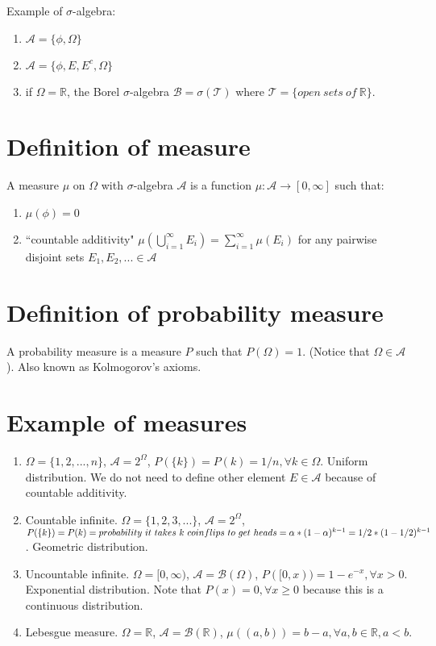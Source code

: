 \documentclass[12pt]{article}
\newcommand{\A}{\mathcal{A}}
\newcommand{\B}{\mathcal{B}}
\newcommand{\T}{\mathcal{T}}
\begin{document}
Example of $\sigma$-algebra:
\begin{enumerate}
    \item $\A=\{\phi, \Omega\}$
    \item $\A=\{\phi,E, E^c, \Omega\}$
    \item if $\Omega = \mathbb{R}$, the Borel $\sigma$-algebra $\B=\sigma(\T)$ where
        $\T=\{open\ sets\ of\ \mathbb{R}\}$.
\end{enumerate}

\section{Definition of measure}

A measure $\mu$ on $\Omega$ with $\sigma$-algebra $\A$ is a function
$\mu: \A \rightarrow [0,\infty]$ such that:

\begin{enumerate}
    \item $\mu(\phi) = 0$
    \item ``countable additivity" $\mu(\bigcup\limits_{i=1}^{\infty} E_i)=\sum\limits_{i=1}^{\infty} \mu(E_i)$ for any pairwise disjoint sets $E_1, E_2, ... \in \A$ 
\end{enumerate}

\section{Definition of probability measure}

A probability measure is a measure $P$ such that $P(\Omega) = 1$. (Notice that $\Omega\in \A$). Also known as Kolmogorov's axioms.

\section{Example of measures}

\begin{enumerate}
\item $\Omega=\{1,2,...,n\}$, $\A=2^\Omega$, 
$P(\{k\})=P(k)=1/n,\forall k\in\Omega$. Uniform distribution. We do
not need to define other element $E\in\A$ because of countable
additivity.

\item Countable infinite. $\Omega=\{1,2,3,...\}$, $\A=2^\Omega$,
$P(\{k\})=P(k)=\\ probability\ it\ takes\ k\ coinflips\ to\ get\ heads
=\alpha * (1-\alpha)^{k-1}=1/2 * (1 - 1/2)^{k-1}$. Geometric distribution.

\item Uncountable infinite. $\Omega=[0,\infty)$, $\A=\B(\Omega)$,
$P([0,x))=1-e^{-x}, \forall x>0$. Exponential distribution. Note
that $P({x})=0,\forall x\ge 0$ because this is a continuous distribution.

\item Lebesgue measure. $\Omega=\mathbb{R}$, $\A=\B(\mathbb{R})$,
$\mu((a,b)) = b - a,\forall a,b\in\mathbb{R},a<b$. 
\end{enumerate}
\end{document}
